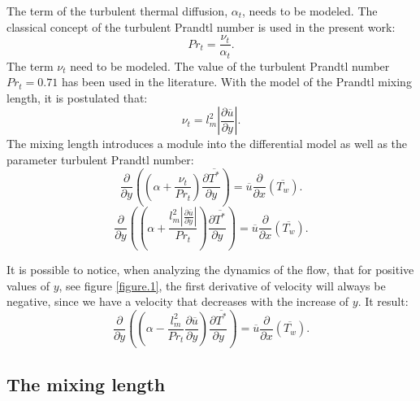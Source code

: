 \documentclass[10pt]{article} %
\begin{document}
The term of the turbulent thermal diffusion, $\alpha_t$, needs to be modeled. 
The classical concept of the turbulent Prandtl number is used in the present work:
\begin{equation}
Pr_t = \frac{\nu_t}{\alpha_t}.
\end{equation} 
The term $ \nu_t $ need to be modeled. The value of the turbulent Prandtl number $ Pr_t = 0.71 $ has been used in the literature.
With the model of the Prandtl mixing length, it is postulated that:
\begin{equation}
\nu_t = {l^2_m} \left| \frac{\partial \overline{u}}{\partial y} \right|.
\end{equation}
The mixing length introduces a module into the differential model as well as the parameter turbulent Prandtl number:
\\
\begin{equation}
{\frac{\partial{}}{\partial{y}}} \left( \left( \alpha   
+ \frac{\nu_t}{Pr_t} \right) \frac{\partial \overline{T^\ast}}{\partial y} \right)
= 
\overline{u}\frac{\partial{}}{\partial{x}}\left(\overline{T_w}\right)  .
\end{equation}
\begin{equation}\label{equationquasela}
{\frac{\partial{}}{\partial{y}}} \left( \left( \alpha   
+ \frac{{l^2_m} \left| \frac{\partial \overline{u}}{\partial y} \right|}{Pr_t} \right) \frac{\partial \overline{T^\ast}}{\partial y} \right)
= 
\overline{u}\frac{\partial{}}{\partial{x}}\left(\overline{T_w}\right)  .
\end{equation}


It is possible to notice, when analyzing the dynamics of the flow, that for positive values of $ y $, see figure \ref{figure.1}, the first derivative of velocity will always be negative, since we have a velocity that decreases with the increase of $ y $. It result:\\
\begin{equation}
{\frac{\partial{}}{\partial{y}}} \left( \left( \alpha   
- \frac{{l^2_m}}{Pr_t}\frac{\partial \overline{u}}{\partial y} \right) \frac{\partial \overline{T^\ast}}{\partial y} \right)
= 
\overline{u}\frac{\partial{}}{\partial{x}}\left(\overline{T_w}\right)  .
\end{equation}


\subsection{The mixing length}
\end{document}
